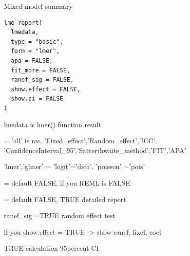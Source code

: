 \documentclass[a4paper]{book}
\begin{document}
%
\begin{Description}
Mixed model summary
\end{Description}
%
\begin{Usage}
\begin{verbatim}
lme_report(
  lmedata,
  type = "basic",
  form = "lmer",
  apa = FALSE,
  fit_more = FALSE,
  ranef_sig = FALSE,
  show.effect = FALSE,
  show.ci = FALSE
)
\end{verbatim}
\end{Usage}
%
\begin{Arguments}
\begin{ldescription}
\item[\code{lmedata}] lmedata is lmer() function result

\item[\code{type}] = 'all' is res, 'Fixed\_effect','Random\_effect','ICC', 'ConfidenceInterval\_95','Satterthwaite\_method','FIT','APA'

\item[\code{form}] 'lmer','glmer' = 'logit'='dich', 'poisson' ='pois'

\item[\code{apa}] = default FALSE, if you  REML is FALSE

\item[\code{fit\_more}] = default FALSE, TRUE detailed report

\item[\code{ranef\_sig}] ranef\_sig =TRUE  random effect test

\item[\code{show.effect}] if you show.effect = TRUE -> show ranef, fixef, coef

\item[\code{show.ci}] TRUE calculation 95percent CI
\end{ldescription}
\end{Arguments}
%
\end{document}
